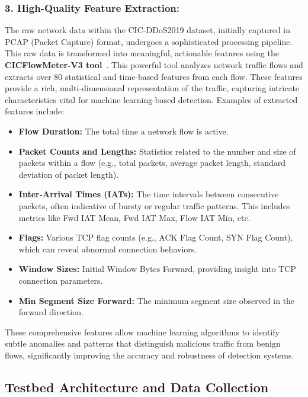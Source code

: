 \documentclass[12pt]{report}
\begin{document}
\subsubsection{3. High-Quality Feature Extraction:}

The raw network data within the CIC-DDoS2019 dataset, initially captured in PCAP (Packet Capture) format, undergoes a sophisticated processing pipeline. This raw data is transformed into meaningful, actionable features using the \textbf{CICFlowMeter-V3 tool}~\cite{cicflowmeter2017,lashkari2017characterization}. This powerful tool analyzes network traffic flows and extracts over 80 statistical and time-based features from each flow. These features provide a rich, multi-dimensional representation of the traffic, capturing intricate characteristics vital for machine learning-based detection. Examples of extracted features include:

\begin{itemize}
\item \textbf{Flow Duration:} The total time a network flow is active.
\item \textbf{Packet Counts and Lengths:} Statistics related to the number and size of packets within a flow (e.g., total packets, average packet length, standard deviation of packet length).
\item \textbf{Inter-Arrival Times (IATs):} The time intervals between consecutive packets, often indicative of bursty or regular traffic patterns. This includes metrics like Fwd IAT Mean, Fwd IAT Max, Flow IAT Min, etc.
\item \textbf{Flags:} Various TCP flag counts (e.g., ACK Flag Count, SYN Flag Count), which can reveal abnormal connection behaviors.
\item \textbf{Window Sizes:} Initial Window Bytes Forward, providing insight into TCP connection parameters.
\item \textbf{Min Segment Size Forward:} The minimum segment size observed in the forward direction.
\end{itemize}

These comprehensive features allow machine learning algorithms to identify subtle anomalies and patterns that distinguish malicious traffic from benign flows, significantly improving the accuracy and robustness of detection systems.

\subsection{Testbed Architecture and Data Collection}
\end{document}
